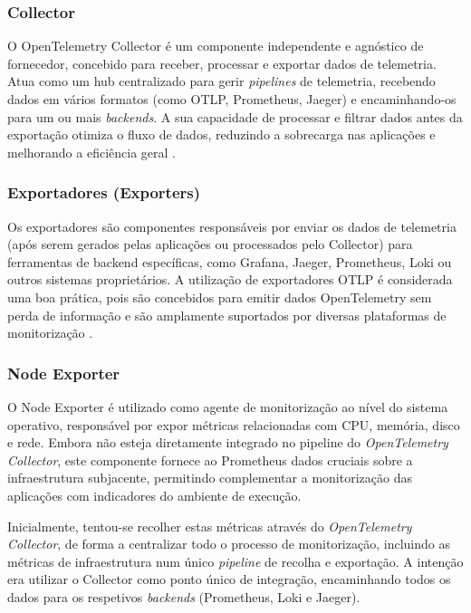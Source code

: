 \subsubsection{Collector}
O OpenTelemetry Collector é um componente independente e agnóstico de fornecedor, concebido para receber, processar e exportar dados de telemetria. Atua como um hub centralizado para gerir \textit{pipelines} de telemetria, recebendo dados em vários formatos (como OTLP, Prometheus, Jaeger) e encaminhando-os para um ou mais \textit{backends}. A sua capacidade de processar e filtrar dados antes da exportação otimiza o fluxo de dados, reduzindo a sobrecarga nas aplicações e melhorando a eficiência geral \cite{opentelemetry_docs,Thakur2022}.

\clearpage

\subsubsection{Exportadores (Exporters)}
Os exportadores são componentes responsáveis por enviar os dados de telemetria (após serem gerados pelas aplicações ou processados pelo Collector) para ferramentas de backend específicas, como Grafana, Jaeger, Prometheus, Loki ou outros sistemas proprietários. A utilização de exportadores OTLP é considerada uma boa prática, pois são concebidos para emitir dados OpenTelemetry sem perda de informação e são amplamente suportados por diversas plataformas de monitorização \cite{opentelemetry_docs,Thakur2022}.



\subsubsection{Node Exporter}
O Node Exporter é utilizado como agente de monitorização ao nível do sistema operativo, responsável por expor métricas relacionadas com CPU, memória, disco e rede. Embora não esteja diretamente integrado no pipeline do \textit{OpenTelemetry Collector}, este componente fornece ao Prometheus dados cruciais sobre a infraestrutura subjacente, permitindo complementar a monitorização das aplicações com indicadores do ambiente de execução.

Inicialmente, tentou-se recolher estas métricas através do \textit{OpenTelemetry Collector}, de forma a centralizar todo o processo de monitorização, incluindo as métricas de infraestrutura num único \textit{pipeline} de recolha e exportação. A intenção era utilizar o Collector como ponto único de integração, encaminhando todos os dados para os respetivos \textit{backends} (Prometheus, Loki e Jaeger).

